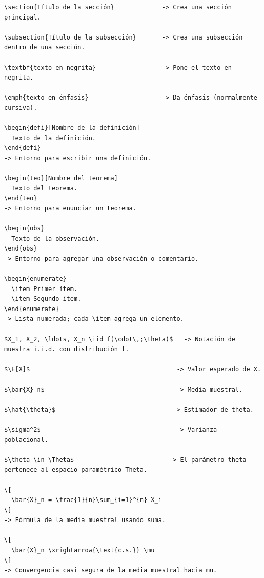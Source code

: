 \begin{verbatim}
\section{Título de la sección}             -> Crea una sección principal.

\subsection{Título de la subsección}       -> Crea una subsección dentro de una sección.

\textbf{texto en negrita}                  -> Pone el texto en negrita.

\emph{texto en énfasis}                    -> Da énfasis (normalmente cursiva).

\begin{defi}[Nombre de la definición]
  Texto de la definición.
\end{defi}
-> Entorno para escribir una definición.

\begin{teo}[Nombre del teorema]
  Texto del teorema.
\end{teo}
-> Entorno para enunciar un teorema.

\begin{obs}
  Texto de la observación.
\end{obs}
-> Entorno para agregar una observación o comentario.

\begin{enumerate}
  \item Primer ítem.
  \item Segundo ítem.
\end{enumerate}
-> Lista numerada; cada \item agrega un elemento.

$X_1, X_2, \ldots, X_n \iid f(\cdot\,;\theta)$   -> Notación de muestra i.i.d. con distribución f.

$\E[X]$                                        -> Valor esperado de X.

$\bar{X}_n$                                    -> Media muestral.

$\hat{\theta}$                                -> Estimador de theta.

$\sigma^2$                                     -> Varianza poblacional.

$\theta \in \Theta$                          -> El parámetro theta pertenece al espacio paramétrico Theta.

\[
  \bar{X}_n = \frac{1}{n}\sum_{i=1}^{n} X_i
\]
-> Fórmula de la media muestral usando suma.

\[
  \bar{X}_n \xrightarrow{\text{c.s.}} \mu
\]
-> Convergencia casi segura de la media muestral hacia mu.
\end{verbatim}
